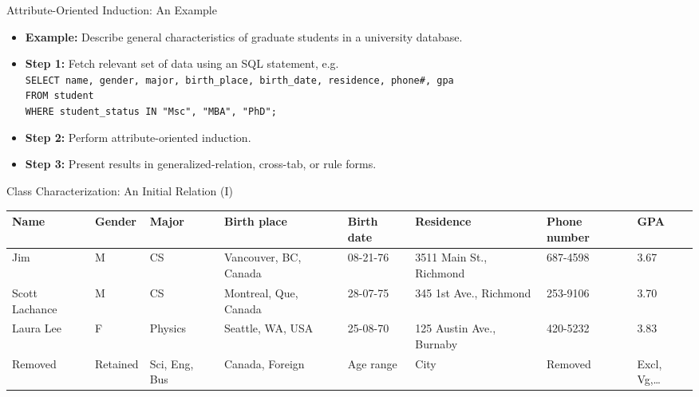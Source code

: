 \begin{frame}{Attribute-Oriented Induction: An Example}
  \begin{itemize}
  \item \textbf{Example:} Describe general characteristics of graduate students in a university database.
  \item \textbf{Step 1:} Fetch relevant set of data using an SQL statement, e.g.\\[0.1cm]
    \texttt{SELECT name, gender, major, birth\_place, birth\_date, residence, phone\#, gpa}\\
    \texttt{FROM student}\\
    \texttt{WHERE student\_status IN {"Msc", "MBA", "PhD"};}\\[0.1cm]
  \item \textbf{Step 2:} Perform attribute-oriented induction.
  \item \textbf{Step 3:} Present results in generalized-relation, cross-tab, or rule forms.
  \end{itemize}
\end{frame}

\begin{frame}{Class Characterization: An Initial Relation (I)}
  \begin{table}
    \small
    \begin{tabularx}{\textwidth}{|X|X|X|X|X|X|X|X|}
      \hline
      \textbf{Name} & \textbf{Gender} & \textbf{Major} & \textbf{Birth place} & \textbf{Birth date} & \textbf{Residence} & \textbf{Phone number} & \textbf{GPA} \\\hline
      Jim & M & CS & Vancouver, BC, Canada & 08-21-76 & 3511 Main St., Richmond & 687-4598 & 3.67 \\\hline
      Scott Lachance & M & CS & Montreal, Que, Canada & 28-07-75 & 345 1st Ave., Richmond & 253-9106 & 3.70 \\\hline
      Laura Lee & F & Physics & Seattle, WA, USA & 25-08-70 & 125 Austin Ave., Burnaby & 420-5232 & 3.83 \\\hline
      {\color{red}Removed} & {\color{red}Retained} & {\color{red}Sci, Eng, Bus} & {\color{red}Canada, Foreign} & {\color{red}Age range} & {\color{red}City} & {\color{red}Removed} & {\color{red}Excl, Vg,\ldots} \\\hline
    \end{tabularx}
  \end{table}
\end{frame}

